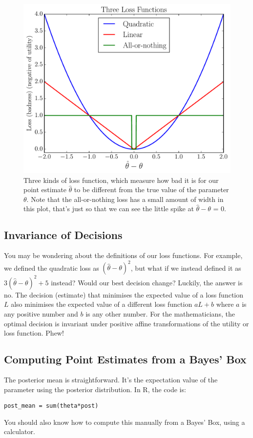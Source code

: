 \begin{figure}[ht!]
\begin{center}
\includegraphics[scale=0.5]{Figures/utility.pdf}
\caption{Three kinds of loss function, which measure how bad it is for our
point estimate $\hat{\theta}$ to be different from the true value of the parameter
$\theta$. Note that the all-or-nothing loss has a small amount of width in this
plot, that's just so that we can see the little spike at
$\hat{\theta} - \theta$ = 0.\label{fig:utility}}
\end{center}
\end{figure}

\subsection{Invariance of Decisions}
You may be wondering about the definitions of our loss functions. For example,
we defined the quadratic loss as $(\hat{\theta} - \theta)^2$, but what if we
instead defined it as $3(\hat{\theta} - \theta)^2 + 5$ instead? Would our
best decision change? Luckily, the answer is no. The decision (estimate) that
minimises the expected value of a loss function $L$ also minimises the expected
value of a different loss function $aL + b$ where $a$ is any positive number
and $b$ is any other number.
For the mathematicians, the optimal decision is invariant under positive affine
transformations of the utility or loss function. Phew!

\subsection{Computing Point Estimates from a Bayes' Box}
The posterior mean is straightforward. It's the expectation value of the parameter
using the posterior distribution. In R, the code is:
\begin{framed}
\begin{verbatim}
post_mean = sum(theta*post)
\end{verbatim}
\end{framed}
You should also know how to compute this manually from a Bayes' Box, using a
calculator.

